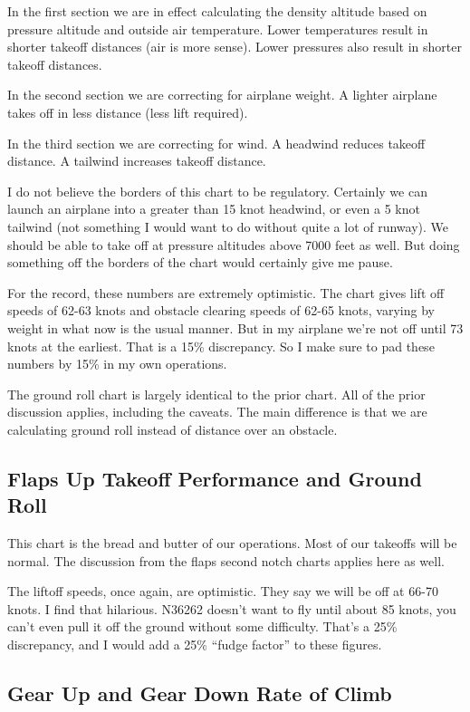 In the first section we are in effect calculating the density altitude based on pressure altitude and outside air temperature. Lower temperatures result in shorter takeoff distances (air is more sense). Lower pressures also result in shorter takeoff distances.

In the second section we are correcting for airplane weight. A lighter airplane takes off in less distance (less lift required).

In the third section we are correcting for wind. A headwind reduces takeoff distance. A tailwind increases takeoff distance.

I do not believe the borders of this chart to be regulatory. Certainly we can launch an airplane into a greater than 15 knot headwind, or even a 5 knot tailwind (not something I would want to do without quite a lot of runway). We should be able to take off at pressure altitudes above 7000 feet as well. But doing something off the borders of the chart would certainly give me pause.

For the record, these numbers are extremely optimistic. The chart gives lift off speeds of 62-63 knots and obstacle clearing speeds of 62-65 knots, varying by weight in what now is the usual manner. But in my airplane we're not off until 73 knots at the earliest. That is a 15\% discrepancy. So I make sure to pad these numbers by 15\% in my own operations.

The ground roll chart is largely identical to the prior chart. All of the prior discussion applies, including the caveats. The main difference is that we are calculating ground roll instead of distance over an obstacle.

\subsection{Flaps Up Takeoff Performance and Ground Roll}

This chart is the bread and butter of our operations. Most of our takeoffs will be normal. The discussion from the flaps second notch charts applies here as well.

The liftoff speeds, once again, are optimistic. They say we will be off at 66-70 knots. I find that hilarious. N36262 doesn't want to fly until about 85 knots, you can't even pull it off the ground without some difficulty. That's a 25\% discrepancy, and I would add a 25\% ``fudge factor'' to these figures.

\subsection{Gear Up and Gear Down Rate of Climb}

